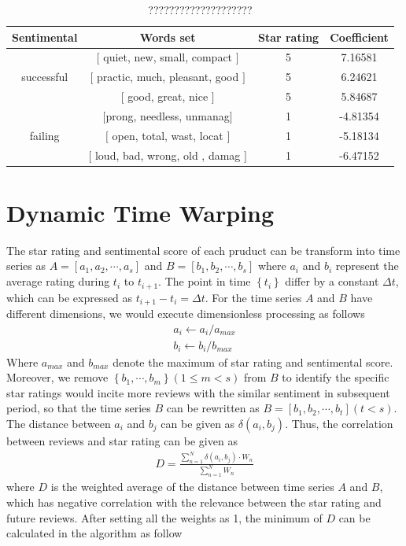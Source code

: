 \documentclass[12pt]{article}%
\begin{document}
\begin{table}[H]
	\centering
	\caption{????????????????????}	
	\begin{tabular}{c|ccc}
		\toprule[1.5pt]
		\multicolumn{1}{m{2cm}}{\centering Sentimental} &
		\multicolumn{1}{m{6cm}}{\centering Words set} & \multicolumn{1}{m{2cm}}{\centering Star rating}&
		\multicolumn{1}{m{2cm}}{\centering  Coefficient}\\
		\midrule[1pt]
		&$\big [$ quiet, new, small, compact $\big ]$ &5&7.16581\\
			successful	&$\big [$ practic, much, pleasant, good $\big ]$ &5&6.24621\\
	 	&$\big [$ good, great, nice $\big ]$ &5&5.84687\\
				\midrule[1pt]
		&$\big [$prong, needless, unmanag$\big ]$ &1&-4.81354\\
	failing	&$\big [$ open, total, wast, locat $\big ]$ &1&-5.18134\\
				&$\big [$ loud, bad, wrong, old , damag $\big ]$ &1&-6.47152\\
		\bottomrule[1.6pt]
	\end{tabular}\label{biasssssso}
\end{table}



\section{Dynamic Time Warping}
The star rating and sentimental score of each pruduct can be transform into time series as $A=[a_{1},a_{2},\cdots,a_{s}]$ and $B=[b_{1},b_{2},\cdots,b_{s}]$ where  $a_{i}$ and $b_{i}$  represent the average rating during $t_{i}$ to $t_{i+1}$. The point in time $\left \{ t_{i}  \right \}$ differ by a constant $\Delta t$, which can be expressed as $t_{i+1}-t_{i}=\Delta t$. 
For the time series $A$ and $B$ have different dimensions, we would execute dimensionless processing as follows
\begin{gather*}
a_{i}\leftarrow a_{i}/a_{max}\\
b_{i}\leftarrow b_{i}/b_{max}
\end{gather*}
Where $a_{max}$ and $b_{max}$ denote the maximum of star rating and sentimental score. Moreover, we remove $\left \{b_{1},\cdots,b_{m}\right \}(1\leqslant m<s)$ from $B$ to identify the specific star ratings would incite more reviews with the similar sentiment in subsequent period, so that the time series $B$ can be rewritten as $B=[b_{1},b_{2},\cdots,b_{t}] (t<s)$. The distance between $a_{i}$ and $b_{j}$ can be given as $\delta(a_{i},b_{j})$. Thus, the correlation between reviews and star rating can be given as
\begin{gather}
 D=\frac{\sum_{n=1}^{N}\delta(a_{i},b_{j})\cdot W_{n}}{\sum_{n=1}^{N}W_{n}}
\end{gather}
where $D$ is the weighted average of the distance between time series $A$ and $B$, which has negative correlation with the relevance between the star rating and future reviews. After setting all the weights as 1, the minimum of $D$ can be calculated in the algorithm as follow%
\end{document}
